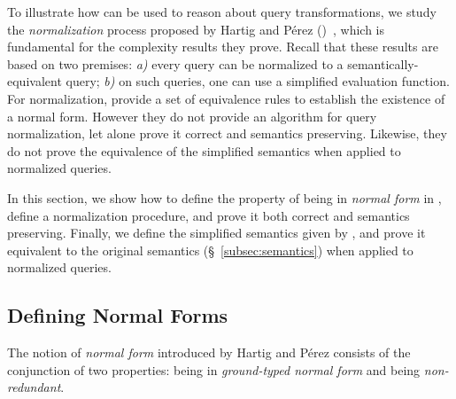 To illustrate how \gcoql can be used to reason about query transformations, we study the {\em normalization} process proposed by Hartig and Pérez (\HP)~\cite{gqlph}, which is fundamental for the complexity results they prove.
%
Recall that these results are based on two premises: {\em a)} every query can be normalized to a semantically-equivalent query; {\em b)} on such queries, one can use a simplified evaluation function. For normalization,  \HP provide a set of equivalence rules to establish the existence of a normal form. However they do not provide an algorithm for query normalization, let alone prove it correct and semantics preserving. Likewise, they do not prove the equivalence of the simplified semantics when applied to normalized queries.

In this section, we show how to define the property of being in \textit{normal form} in \gcoql, define a normalization procedure, and prove it both correct and semantics preserving. Finally, we define the simplified semantics given by \HP, and prove it equivalent to the original semantics (\S~\ref{subsec:semantics}) when applied to normalized queries.


\subsection{Defining Normal Forms}

The notion of \textit{normal form} introduced by Hartig and Pérez consists of the conjunction of two properties: being in \textit{ground-typed normal form} and being \textit{non-redundant}.

